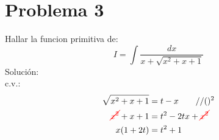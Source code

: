 \section{Problema 3}
    Hallar la funcion primitiva de:
    \begin{equation*}
        I=\int\frac{dx}{x+\sqrt{x^2+x+1}}
    \end{equation*}
    Solución:\\
    c.v.:
    \begin{equation*}
        \begin{split}
            \sqrt{x^2+x+1}&=t-x\qquad //()^2 \\
            \textcolor{red}{\cancel{x^2}}+x+1&=t^2-2tx+\textcolor{red}{\cancel{x^2}} \\
            x(1+2t)&=t^2+1
        \end{split}
    \end{equation*}